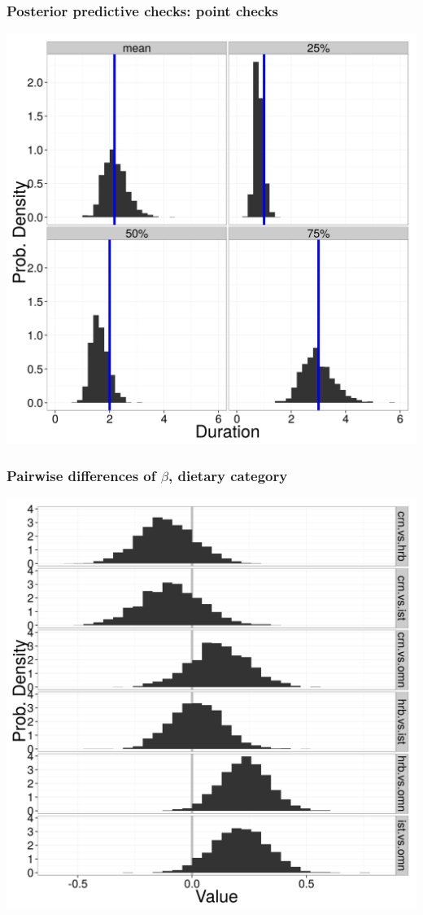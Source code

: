 \documentclass{beamer}
\begin{document}
\begin{frame}
  \frametitle{Posterior predictive checks: point checks}
  \begin{center}
    \includegraphics[height = 0.8\textheight, width = \textwidth,  keepaspectratio = true]{figure/quant_ppc}
  \end{center}
\end{frame}

\begin{frame}
  \frametitle{Pairwise differences of \(\beta\), dietary category}
  \begin{center}
    \includegraphics[height = 0.8\textheight, width = \textwidth,  keepaspectratio = true]{figure/diet_diff_est}
  \end{center}
\end{frame}
\end{document}
